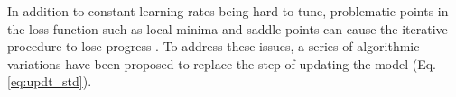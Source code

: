 In addition to constant learning rates being hard to tune, problematic points in the loss function such as local minima and saddle points can cause the iterative procedure to lose progress \citep[p. 116-117]{Ketkar2017}.
To address these issues, a series of algorithmic variations have been proposed to replace the step of updating the model (Eq. \ref{eq:updt_std}).
